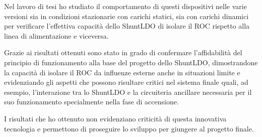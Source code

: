 \documentclass[a4paper,12pt,italian]{article}
\begin{document}

Nel lavoro di tesi ho studiato il comportamento di questi dispositivi nelle varie versioni sia in condizioni stazionarie con carichi statici, sia con carichi dinamici per verificare l'effettiva capacità dello ShuntLDO di isolare il ROC rispetto alla linea di alimentazione e viceversa. 

Grazie ai risultati ottenuti sono stato in grado di confermare l'affidabilità del principio di funzionamento alla base del progetto dello ShuntLDO, dimostrandone la capacità di isolare il ROC da influenze esterne anche in situazioni limite e evidenziando gli aspetti che possono risultare critici nel sistema finale quali, ad esempio, l'interazione tra lo ShuntLDO e la circuiteria ancillare necessaria per il suo funzionamento specialmente nella fase di accensione.

I risultati che ho ottenuto non evidenziano criticit\`a di questa innovativa tecnologia e permettono di proseguire lo sviluppo per giungere al progetto finale.
\end{document}

